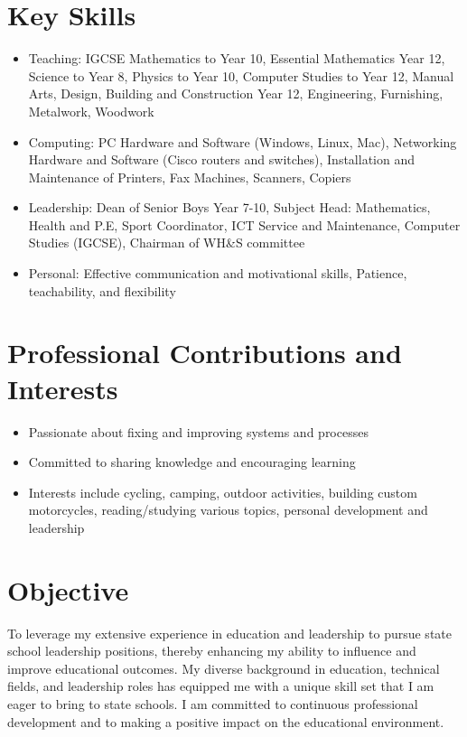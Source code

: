 \documentclass[11pt,a4paper]{article}
\begin{document}
\section*{Key Skills}
\begin{itemize}
    \item Teaching: IGCSE Mathematics to Year 10, Essential Mathematics Year 12, Science to Year 8, Physics to Year 10, Computer Studies to Year 12, Manual Arts, Design, Building and Construction Year 12, Engineering, Furnishing, Metalwork, Woodwork
    \item Computing: PC Hardware and Software (Windows, Linux, Mac), Networking Hardware and Software (Cisco routers and switches), Installation and Maintenance of Printers, Fax Machines, Scanners, Copiers
    \item Leadership: Dean of Senior Boys Year 7-10, Subject Head: Mathematics, Health and P.E, Sport Coordinator, ICT Service and Maintenance, Computer Studies (IGCSE), Chairman of WH\&S committee
    \item Personal: Effective communication and motivational skills, Patience, teachability, and flexibility
\end{itemize}

\section*{Professional Contributions and Interests}
\begin{itemize}
    \item Passionate about fixing and improving systems and processes
    \item Committed to sharing knowledge and encouraging learning
    \item Interests include cycling, camping, outdoor activities, building custom motorcycles, reading/studying various topics, personal development and leadership
\end{itemize}

\section*{Objective}
To leverage my extensive experience in education and leadership to pursue state school leadership positions, thereby enhancing my ability to influence and improve educational outcomes. My diverse background in education, technical fields, and leadership roles has equipped me with a unique skill set that I am eager to bring to state schools. I am committed to continuous professional development and to making a positive impact on the educational environment.
\end{document}
